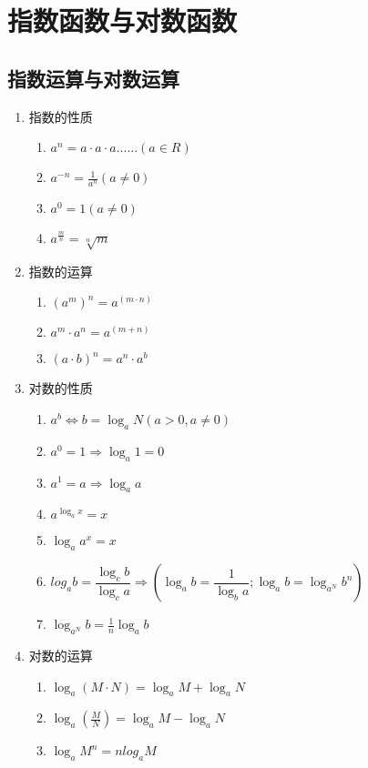 \chapter{指数函数与对数函数}
\section{指数运算与对数运算}
\begin{enumerate}
	\item 指数的性质
	\begin{enumerate}
		\item $a^n=a·a·a......(a\in R)$
		\item $a^{-n}=\frac{1}{a^n} (a\neq 0)$
		\item  $a^0=1 (a\neq 0)$
		 \item $a^{\frac{m}{n}}=\sqrt[n]{m}$
	\end{enumerate}
\item  指数的运算
  \begin{enumerate}
  	\item $(a^m)^n=a^{(m·n)}$
  	\item $a^m·a^n=a^{(m+n)}$
  	\item $(a·b)^n=a^n·a^b$
  \end{enumerate}
\item 对数的性质
     \begin{enumerate}
     	\item $a^b \Longleftrightarrow b=\log_aN (a>0,a\neq 0)$
     	\item $a^0=1\Longrightarrow \log_a1=0$
     	\item  $a^1=a \Longrightarrow \log_a a$ 
     	\item $a^{\log_a x}=x$
     	\item $\log_a a^x=x$
     	\item $log_ab=\dfrac{\log_c b}{\log_c a} \Longrightarrow (\log_a b=\dfrac{1}{\log_b a};\log_a b=\log_{a^N}b^n)$
     	\item  $\log_{a^N}b=\frac{1}{n}\log_ab$
     \end{enumerate}
 \item 对数的运算
 \begin{enumerate}
 	\item $\log_a(M·N)=\log_a M +\log_a N$
 	\item $\log_a(\frac{M}{N})=\log_a M-\log_aN$
 	\item $\log_aM^n=nlog_a M$
 \end{enumerate}
 
\end{enumerate}
